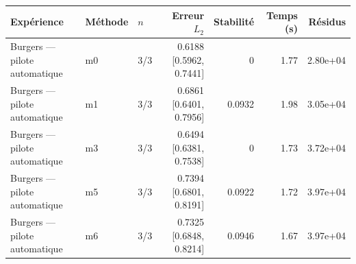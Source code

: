 \begin{tabular}{lllrrrr}
\toprule
Expérience & Méthode & $n$ & Erreur $L_2$ & Stabilité & Temps (s) & Résidus \\
\midrule
Burgers — pilote automatique & m0 & 3/3 & 0.6188 [0.5962, 0.7441] & 0 & 1.77 & 2.80e+04 \\
Burgers — pilote automatique & m1 & 3/3 & 0.6861 [0.6401, 0.7956] & 0.0932 & 1.98 & 3.05e+04 \\
Burgers — pilote automatique & m3 & 3/3 & 0.6494 [0.6381, 0.7538] & 0 & 1.73 & 3.72e+04 \\
Burgers — pilote automatique & m5 & 3/3 & 0.7394 [0.6801, 0.8191] & 0.0922 & 1.72 & 3.97e+04 \\
Burgers — pilote automatique & m6 & 3/3 & 0.7325 [0.6848, 0.8214] & 0.0946 & 1.67 & 3.97e+04 \\
\bottomrule
\end{tabular}

